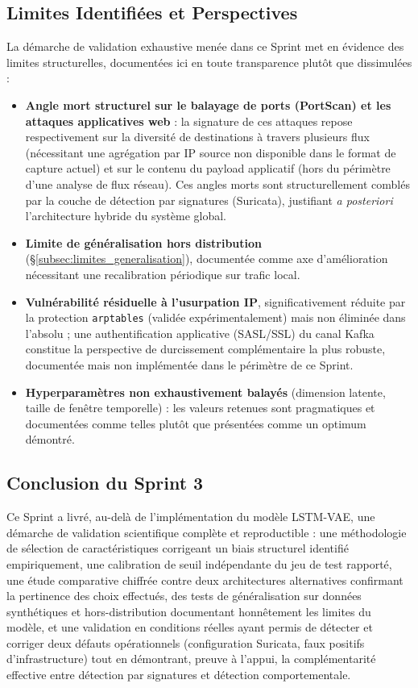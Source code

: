 \subsection{Limites Identifiées et Perspectives}
\label{sec:limites_chapitre}
La démarche de validation exhaustive menée dans ce Sprint met en évidence des limites structurelles, documentées ici en toute transparence plutôt que dissimulées :
\begin{itemize}
    \item \textbf{Angle mort structurel sur le balayage de ports (PortScan) et les attaques applicatives web} : la signature de ces attaques repose respectivement sur la diversité de destinations à travers plusieurs flux (nécessitant une agrégation par IP source non disponible dans le format de capture actuel) et sur le contenu du payload applicatif (hors du périmètre d'une analyse de flux réseau). Ces angles morts sont structurellement comblés par la couche de détection par signatures (Suricata), justifiant \textit{a posteriori} l'architecture hybride du système global.
    \item \textbf{Limite de généralisation hors distribution} (\S\ref{subsec:limites_generalisation}), documentée comme axe d'amélioration nécessitant une recalibration périodique sur trafic local.
    \item \textbf{Vulnérabilité résiduelle à l'usurpation IP}, significativement réduite par la protection \texttt{arptables} (validée expérimentalement) mais non éliminée dans l'absolu ; une authentification applicative (SASL/SSL) du canal Kafka constitue la perspective de durcissement complémentaire la plus robuste, documentée mais non implémentée dans le périmètre de ce Sprint.
    \item \textbf{Hyperparamètres non exhaustivement balayés} (dimension latente, taille de fenêtre temporelle) : les valeurs retenues sont pragmatiques et documentées comme telles plutôt que présentées comme un optimum démontré.
\end{itemize}

\subsection{Conclusion du Sprint 3}
Ce Sprint a livré, au-delà de l'implémentation du modèle LSTM-VAE, une démarche de validation scientifique complète et reproductible : une méthodologie de sélection de caractéristiques corrigeant un biais structurel identifié empiriquement, une calibration de seuil indépendante du jeu de test rapporté, une étude comparative chiffrée contre deux architectures alternatives confirmant la pertinence des choix effectués, des tests de généralisation sur données synthétiques et hors-distribution documentant honnêtement les limites du modèle, et une validation en conditions réelles ayant permis de détecter et corriger deux défauts opérationnels (configuration Suricata, faux positifs d'infrastructure) tout en démontrant, preuve à l'appui, la complémentarité effective entre détection par signatures et détection comportementale.

